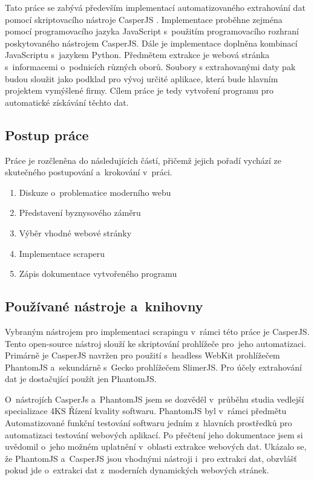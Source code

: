 \documentclass[11pt,a4paper]{article}
\begin{document}
Tato práce se zabývá především implementací automatizovaného extrahování dat pomocí skriptovacího nástroje CasperJS \cite{casperjs}. Implementace proběhne zejména pomocí programovacího jazyka JavaScript s~použitím programovacího rozhraní poskytovaného nástrojem CasperJS. Dále je implementace doplněna kombinací JavaScriptu s~jazykem Python. Předmětem extrakce je webová stránka s~informacemi o~podnicích různých oborů. Soubory s extrahovanými daty pak budou sloužit jako podklad pro vývoj určité aplikace, která bude hlavním projektem vymýšlené firmy. Cílem práce je tedy vytvoření programu pro automatické získávání těchto dat.

\subsection{Postup práce}
Práce je rozčleněna do následujících částí, přičemž jejich pořadí vychází ze skutečného postupování a~krokování v~práci.
\begin{enumerate}
\item Diskuze o~problematice moderního webu
\item Představení byznysového záměru
\item Výběr vhodné webové stránky
\item Implementace scraperu
\item Zápis dokumentace vytvořeného programu
\end{enumerate}

\subsection{Používané nástroje a~knihovny}
Vybraným nástrojem pro implementaci scrapingu v~rámci této práce je CasperJS. Tento open-source nástroj slouží ke skriptování prohlížeče pro~jeho automatizaci. Primárně je CasperJS navržen pro použití s~headless WebKit prohlížečem PhantomJS a~sekundárně s~Gecko prohlížečem SlimerJS. Pro účely extrahování dat je dostačující použít jen PhantomJS.

O~nástrojích CasperJs a~PhantomJS jsem se dozvěděl v~průběhu studia vedlejší specializace 4KS Řízení kvality softwaru. PhantomJS byl v~rámci předmětu Automatizované funkční testování softwaru jedním z~hlavních prostředků pro automatizaci testování webových aplikací. Po přečtení jeho dokumentace jsem si uvědomil o~jeho možném uplatnění v~oblasti extrakce webových dat. Ukázalo se, že PhantomJS a~CasperJS jsou vhodnými nástroji i~pro extrakci dat, obzvlášť pokud jde o~extrakci dat z~moderních dynamických webových stránek.
\end{document}
